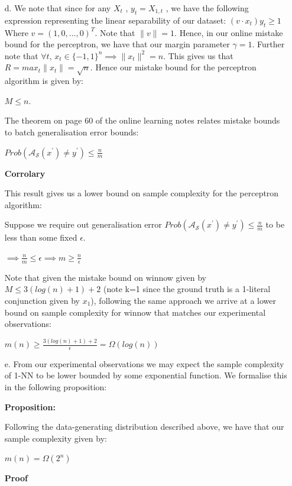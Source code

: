 \documentclass[12pt]{article}
\begin{document}
\begin{itemize}
    \item[d.]
    We note that since for any $X_{t}$ , $y_{t} = X_{1,t}$ , we have the following
     expression representing the linear separability of our dataset:
    $(v \cdot x_{t})y_{t} \ge 1$
    Where $v = (1,0, \dots, 0)^{T}$. Note that $\|v\| =1$.
    Hence, in our online mistake bound for the perceptron, we have that our margin parameter $\gamma =1$.
    Further note that $\forall t$, $x_{t} \in \{-1,1\}^{n} \implies \|x_{t}\|^{2}
    = n$. This gives us that $R = max_{t} \|x_{t}\| = \sqrt{n}$.
    Hence our mistake bound for the perceptron algorithm is given by:
    
    $M \le n $.

    The theorem on page 60 of the online learning notes relates mistake bounds to batch generalisation error bounds:

    $Prob(\mathcal{A_{S}}(x ^{\prime}) \ne y^{\prime} ) \le \frac{n}{m}$

    \textbf{Corrolary}

    This result gives us a lower bound on sample complexity for the perceptron algorithm:

    Suppose we require out generalisation error $ Prob(\mathcal{A_{S}}(x ^{\prime}) \ne y^{\prime} ) \le \frac{n}{m}$ to be  less than some fixed $\epsilon$.

    $\implies \frac{n}{m} \le \epsilon \implies m \ge \frac{n}{\epsilon}$

    Note that given the mistake bound on winnow given by $ M \le 3 (log(n) + 1) +2$ (note k=1 since the ground truth is a 1-literal conjunction given by $x_{1}$), following the same approach we arrive at a lower bound on sample complexity for winnow that
    matches our experimental observations:

    $m(n) \ge \frac{3 (log(n) + 1) +2}{\epsilon} = \Omega (log(n))$


\newpage

     \item[e.]
     From our experimental observations we may expect the sample complexity of 1-NN to be lower bounded by some exponential function. We formalise this in the following proposition:

     \textbf{Proposition:}

     Following the data-generating distribution described above, we have that our sample complexity given by:
 
     $m(n) = \Omega (2^{n})$ 

    \textbf{Proof}


\end{itemize}
\end{document}

